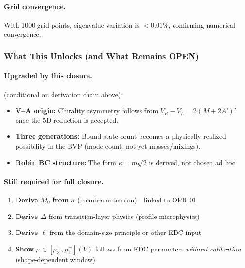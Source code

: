 \paragraph{Grid convergence.}
With 1000 grid points, eigenvalue variation is $< 0.01\%$, confirming numerical
convergence.

\subsubsection{What This Unlocks (and What Remains OPEN)}
\label{subsubsec:opr21_remaining}

\paragraph{Upgraded by this closure.}
\tagDc{} (conditional on derivation chain above):
\begin{itemize}[nosep]
    \item \textbf{V--A origin:} Chirality asymmetry follows from
          $V_R - V_L = 2(M + 2A')'$ once the 5D reduction is accepted.
    \item \textbf{Three generations:} Bound-state count becomes a physically
          realized possibility in the BVP (mode count, not yet masses/mixings).
    \item \textbf{Robin BC structure:} The form $\kappa = m_b/2$ is derived,
          not chosen ad hoc.
\end{itemize}

\paragraph{Still required for full closure.}
\begin{enumerate}[nosep]
    \item \textbf{Derive $M_0$ from $\sigma$} (membrane tension)---linked to OPR-01
    \item \textbf{Derive $\Delta$} from transition-layer physics (profile microphysics)
    \item \textbf{Derive $\ell$} from the domain-size principle or other EDC input
    \item \textbf{Show $\mu \in [\mu_3^-, \mu_3^+](V)$} follows from EDC parameters
          \emph{without calibration} (shape-dependent window)
\end{enumerate}

